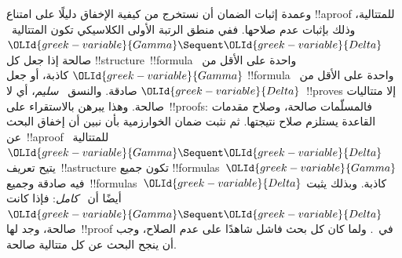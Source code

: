 \documentclass[../../../include/open-logic-section]{subfiles}
\begin{document}
وعمدة إثبات الضمان أن نستخرج من كيفية الإخفاق دليلًا على امتناع
!!a{proof} للمتتالية، وذلك بإثبات عدم صلاحها. ففي منطق الرتبة الأولى
الكلاسيكي تكون المتتالية~$\OLId{greek-variable}{Gamma}\Sequent\OLId{greek-variable}{Delta}$ صالحة إذا جعل كل
!!{structure}~!!{formula} واحدة على الأقل من~$\OLId{greek-variable}{Gamma}$ كاذبة، أو جعل
!!{formula} واحدة على الأقل من~$\OLId{greek-variable}{Delta}$ صادقة. والنسق~
\emph{سليم}، أي لا~!!{prove}s إلا متتاليات صالحة. وهذا يبرهن بالاستقراء
على~!!{proof}s: فالمسلّمات صالحة، وصلاح مقدمات القاعدة يستلزم صلاح
نتيجتها. ثم نثبت ضمان الخوارزمية بأن نبين أن إخفاق البحث عن~!!a{proof}
للمتتالية~$\OLId{greek-variable}{Gamma}\Sequent\OLId{greek-variable}{Delta}$ يتيح تعريف~!!a{structure} تكون جميع
!!{formula}s~$\OLId{greek-variable}{Gamma}$ فيه صادقة وجميع~!!{formula}s~$\OLId{greek-variable}{Delta}$ كاذبة.
وبذلك يثبت أيضًا أن~ \emph{كامل}: فإذا كانت
$\OLId{greek-variable}{Gamma}\Sequent\OLId{greek-variable}{Delta}$ صالحة، وجد لها~!!{proof} في~. ولما كان
كل بحث فاشل شاهدًا على عدم الصلاح، وجب أن ينجح البحث عن كل متتالية صالحة.
\end{document}
